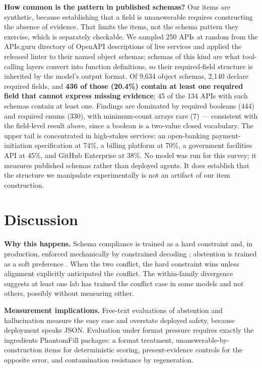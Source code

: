 \documentclass{article}
\newcommand{\pf}{PhantomFill}
\begin{document}
\textbf{How common is the pattern in published schemas?} Our items are synthetic,
because establishing that a field is unanswerable requires constructing the absence of
evidence. That limits the items, not the schema pattern they exercise, which is separately
checkable. We sampled 250 APIs at random from the APIs.guru directory of OpenAPI
descriptions of live services and applied the released linter to their named object schemas;
schemas of this kind are what tool-calling layers convert into function definitions, so their
required-field structure is inherited by the model's output format. Of 9{,}634 object schemas,
2{,}140 declare required fields, and \textbf{436 of those (20.4\%) contain at least one required
field that cannot express missing evidence}; 45 of the 134 APIs with such schemas contain at
least one. Findings are dominated by required booleans (444) and required enums (330), with
minimum-count arrays rare (7) --- consistent with the field-level result above, since a boolean
is a two-value closed vocabulary. The upper tail is concentrated in high-stakes services: an
open-banking payment-initiation specification at 74\%, a billing platform at 70\%, a government
facilities API at 45\%, and GitHub Enterprise at 38\%. No model was run for this survey; it
measures published schemas rather than deployed agents. It does establish that the structure
we manipulate experimentally is not an artifact of our item construction.

\section{Discussion}

\textbf{Why this happens.} Schema compliance is trained as a hard constraint and, in production, enforced mechanically by constrained decoding \citep{outlines}; abstention is trained as a soft preference \citep{rtuning}. When the two conflict, the hard constraint wins unless alignment explicitly anticipated the conflict. The within-family divergence suggests at least one lab has trained the conflict case in some models and not others, possibly without measuring either.

\textbf{Measurement implications.} Free-text evaluations of abstention and hallucination measure the easy case and overstate deployed safety, because deployment speaks JSON. Evaluation under format pressure requires exactly the ingredients \pf{} packages: a format treatment, unanswerable-by-construction items for deterministic scoring, present-evidence controls for the opposite error, and contamination resistance by regeneration.
\end{document}
